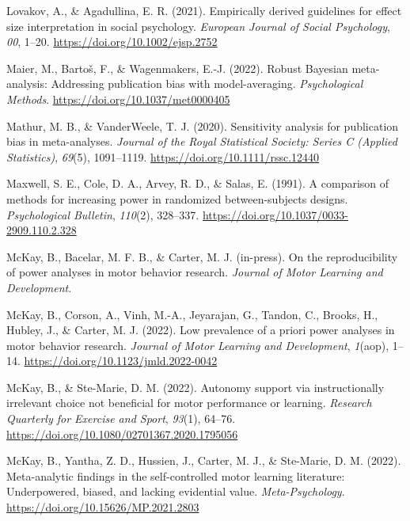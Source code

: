 \documentclass[
  man, donotrepeattitle,mask,floatsintext]{apa7}
\newlength{\cslhangindent}
\newlength{\cslentryspacingunit} %
\newenvironment{CSLReferences}[2] %
 {%
  \setlength{\parindent}{0pt}
  \ifodd #1
  \let\oldpar\par
  \def\par{\hangindent=\cslhangindent\oldpar}
  \fi
  \setlength{\parskip}{#2\cslentryspacingunit}
 }%
 {}
\begin{document}
\begin{CSLReferences}{1}{0}
\leavevmode{}%
Lovakov, A., \& Agadullina, E. R. (2021). Empirically derived guidelines for effect size interpretation in social psychology. \emph{European Journal of Social Psychology}, \emph{00}, 1--20. \url{https://doi.org/10.1002/ejsp.2752}

\leavevmode{}%
Maier, M., Bartoš, F., \& Wagenmakers, E.-J. (2022). Robust {Bayesian} meta-analysis: Addressing publication bias with model-averaging. \emph{Psychological Methods}. \url{https://doi.org/10.1037/met0000405}

\leavevmode{}%
Mathur, M. B., \& VanderWeele, T. J. (2020). Sensitivity analysis for publication bias in meta-analyses. \emph{Journal of the Royal Statistical Society: Series C (Applied Statistics)}, \emph{69}(5), 1091--1119. \url{https://doi.org/10.1111/rssc.12440}

\leavevmode{}%
Maxwell, S. E., Cole, D. A., Arvey, R. D., \& Salas, E. (1991). A comparison of methods for increasing power in randomized between-subjects designs. \emph{Psychological Bulletin}, \emph{110}(2), 328--337. \url{https://doi.org/10.1037/0033-2909.110.2.328}

\leavevmode{}%
McKay, B., Bacelar, M. F. B., \& Carter, M. J. (in-press). On the reproducibility of power analyses in motor behavior research. \emph{Journal of Motor Learning and Development}.

\leavevmode{}%
McKay, B., Corson, A., Vinh, M.-A., Jeyarajan, G., Tandon, C., Brooks, H., Hubley, J., \& Carter, M. J. (2022). Low prevalence of a priori power analyses in motor behavior research. \emph{Journal of Motor Learning and Development}, \emph{1}(aop), 1--14. \url{https://doi.org/10.1123/jmld.2022-0042}

\leavevmode{}%
McKay, B., \& Ste-Marie, D. M. (2022). Autonomy support via instructionally irrelevant choice not beneficial for motor performance or learning. \emph{Research Quarterly for Exercise and Sport}, \emph{93}(1), 64--76. \url{https://doi.org/10.1080/02701367.2020.1795056}

\leavevmode{}%
McKay, B., Yantha, Z. D., Hussien, J., Carter, M. J., \& Ste-Marie, D. M. (2022). Meta-analytic findings in the self-controlled motor learning literature: Underpowered, biased, and lacking evidential value. \emph{Meta-Psychology}. \url{https://doi.org/10.15626/MP.2021.2803}


\end{CSLReferences}
\end{document}
